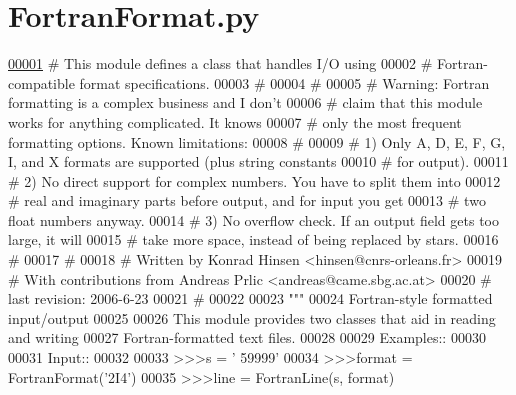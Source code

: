 \hypertarget{_fortran_format_8py_source}{}\section{Fortran\+Format.\+py}
\label{_fortran_format_8py_source}

\begin{DoxyCode}
\hypertarget{_fortran_format_8py_source_l00001}{}\hyperlink{namespacepyneb_1_1utils_1_1_fortran_format}{00001} \textcolor{comment}{# This module defines a class that handles I/O using}
00002 \textcolor{comment}{# Fortran-compatible format specifications.}
00003 \textcolor{comment}{#}
00004 \textcolor{comment}{#}
00005 \textcolor{comment}{# Warning: Fortran formatting is a complex business and I don't}
00006 \textcolor{comment}{# claim that this module works for anything complicated. It knows}
00007 \textcolor{comment}{# only the most frequent formatting options. Known limitations:}
00008 \textcolor{comment}{#}
00009 \textcolor{comment}{# 1) Only A, D, E, F, G, I, and X formats are supported (plus string constants}
00010 \textcolor{comment}{#    for output).}
00011 \textcolor{comment}{# 2) No direct support for complex numbers. You have to split them into}
00012 \textcolor{comment}{#    real and imaginary parts before output, and for input you get}
00013 \textcolor{comment}{#    two float numbers anyway.}
00014 \textcolor{comment}{# 3) No overflow check. If an output field gets too large, it will}
00015 \textcolor{comment}{#    take more space, instead of being replaced by stars.}
00016 \textcolor{comment}{#}
00017 \textcolor{comment}{#}
00018 \textcolor{comment}{# Written by Konrad Hinsen <hinsen@cnrs-orleans.fr>}
00019 \textcolor{comment}{# With contributions from Andreas Prlic <andreas@came.sbg.ac.at>}
00020 \textcolor{comment}{# last revision: 2006-6-23}
00021 \textcolor{comment}{#}
00022 
00023 \textcolor{stringliteral}{"""}
00024 \textcolor{stringliteral}{Fortran-style formatted input/output}
00025 \textcolor{stringliteral}{}
00026 \textcolor{stringliteral}{This module provides two classes that aid in reading and writing}
00027 \textcolor{stringliteral}{Fortran-formatted text files.}
00028 \textcolor{stringliteral}{}
00029 \textcolor{stringliteral}{Examples::}
00030 \textcolor{stringliteral}{}
00031 \textcolor{stringliteral}{  Input::}
00032 \textcolor{stringliteral}{}
00033 \textcolor{stringliteral}{    >>>s = '   59999'}
00034 \textcolor{stringliteral}{    >>>format = FortranFormat('2I4')}
00035 \textcolor{stringliteral}{    >>>line = FortranLine(s, format)}

\end{DoxyCode}

